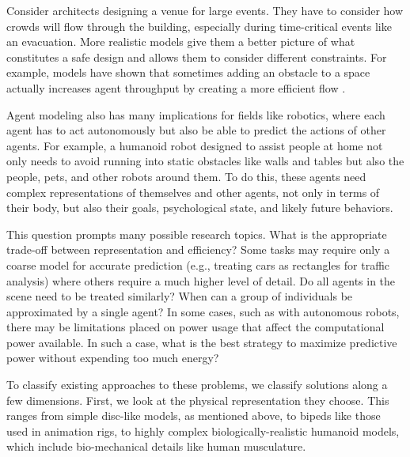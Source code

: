 \documentclass[tog]{acmsiggraph}
\begin{document}
Consider architects designing a venue for large events. They have to consider how crowds will flow through the building, especially during time-critical events like an evacuation. More realistic models give them a better picture of what constitutes a safe design and allows them to consider different constraints. For example, models have shown that sometimes adding an obstacle to a space actually increases agent throughput by creating a more efficient flow \cite{helbing2002simulation}.

Agent modeling also has many implications for fields like robotics, where each agent has to act autonomously but also be able to predict the actions of other agents. For example, a humanoid robot designed to assist people at home not only needs to avoid running into static obstacles like walls and tables but also the people, pets, and other robots around them. To do this, these agents need complex representations of themselves and other agents, not only in terms of their body, but also their goals, psychological state, and likely future behaviors.

This question prompts many possible research topics. What is the appropriate trade-off between representation and efficiency? Some tasks may require only a coarse model for accurate prediction (e.g., treating cars as rectangles for traffic analysis) where others require a much higher level of detail. Do all agents in the scene need to be treated similarly? When can a group of individuals be approximated by a single agent? In some cases, such as with autonomous robots, there may be limitations placed on power usage that affect the computational power available. In such a case, what is the best strategy to maximize predictive power without expending too much energy?

To classify existing approaches to these problems, we classify solutions along a few dimensions. First, we look at the physical representation they choose. This ranges from simple disc-like models, as mentioned above, to bipeds like those used in animation rigs, to highly complex biologically-realistic humanoid models, which include bio-mechanical details like human musculature.
\end{document}
